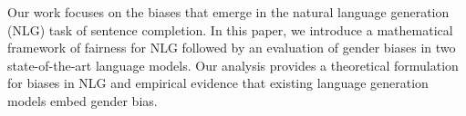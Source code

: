 Our work focuses on the biases that emerge in the natural language generation (NLG) task of sentence completion. In this paper, we introduce a mathematical framework of fairness for NLG followed by an evaluation of gender biases in two state-of-the-art language models. Our analysis provides a theoretical formulation for biases in NLG and empirical evidence that existing language generation models embed gender bias.
